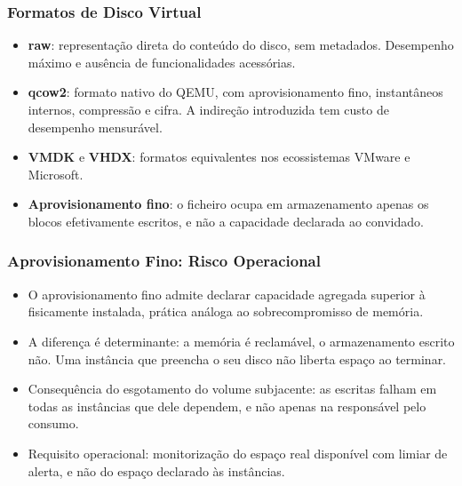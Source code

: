 \documentclass[aspectratio=169]{beamer}
\begin{document}
\begin{frame}
\frametitle{Formatos de Disco Virtual}
\begin{itemize}
    \setlength\itemsep{0.35cm}
    \item \textbf{raw}: representação direta do conteúdo do disco, sem metadados. Desempenho máximo e ausência de funcionalidades acessórias.
    \item \textbf{qcow2}: formato nativo do QEMU, com aprovisionamento fino, instantâneos internos, compressão e cifra. A indireção introduzida tem custo de desempenho mensurável.
    \item \textbf{VMDK} e \textbf{VHDX}: formatos equivalentes nos ecossistemas VMware e Microsoft.
    \item \textbf{Aprovisionamento fino}: o ficheiro ocupa em armazenamento apenas os blocos efetivamente escritos, e não a capacidade declarada ao convidado.
\end{itemize}
\end{frame}

\begin{frame}
\frametitle{Aprovisionamento Fino: Risco Operacional}
\begin{itemize}
    \setlength\itemsep{0.4cm}
    \item O aprovisionamento fino admite declarar capacidade agregada superior à fisicamente instalada, prática análoga ao sobrecompromisso de memória.
    \item A diferença é determinante: a memória é reclamável, o armazenamento escrito não. Uma instância que preencha o seu disco não liberta espaço ao terminar.
    \item Consequência do esgotamento do volume subjacente: as escritas falham em todas as instâncias que dele dependem, e não apenas na responsável pelo consumo.
    \item Requisito operacional: monitorização do espaço real disponível com limiar de alerta, e não do espaço declarado às instâncias.
\end{itemize}
\end{frame}
\end{document}
